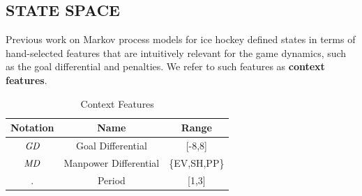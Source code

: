 \subsection{STATE SPACE}
\label{subsec:context}

Previous work on Markov process models for ice hockey \citep{Thomas2013} defined states in terms of hand-selected features that are intuitively relevant for the game dynamics, such as the goal differential and penalties.
We refer to such features as \textbf{context features}. 

\begin{table}[htbp]
\caption{Context Features}
\label{table:context-features}
\begin{center}
\begin{tabular}{|c|c|c|}
\hline
Notation & Name & Range \\\hline
$\it{GD}$ & Goal Differential & [-8,8]\\ \hline
$\it{MD}$ & Manpower Differential & \{EV,SH,PP\}\\ \hline
$\period$ & Period & [1,3]\\\hline
\end{tabular}
\end{center}
\label{default}
\end{table}%

